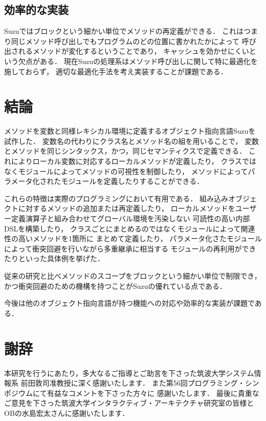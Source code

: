\documentclass[a4paper,11pt,dvipdfmx]{jreport}
\begin{document}
\section{効率的な実装}

Suzuではブロックという細かい単位でメソッドの再定義ができる．
これはつまり同じメソッド呼び出しでもプログラムのどの位置に書かれたかによって
呼び出されるメソッドが変化するということであり，
キャッシュを効かせにくいという欠点がある．
現在Suzuの処理系はメソッド呼び出しに関して特に最適化を施しておらず，
適切な最適化手法を考え実装することが課題である．


\chapter{結論}
\label{chapter:conclusion}

メソッドを変数と同様レキシカル環境に定義するオブジェクト指向言語Suzuを試作した．
変数名の代わりにクラス名とメソッド名の組を用いることで，
変数とメソッドを同じシンタックス，かつ，同じセマンティクスで定義できる．
これによりローカル変数に対応するローカルメソッドが定義したり，
クラスではなくモジュールによってメソッドの可視性を制御したり，
メソッドによってパラメータ化されたモジュールを定義したりすることができる．

これらの特徴は実際のプログラミングにおいて有用である．
組み込みオブジェクトに対するメソッドの追加または再定義したり，
ローカルメソッドをユーザー定義演算子と組み合わせてグローバル環境を汚染しない
可読性の高い内部DSLを構築したり，
クラスごとにまとめるのではなくモジュールによって関連性の高いメソッドを1箇所に
まとめて定義したり，
パラメータ化さたモジュールによって衝突回避を行いながら多重継承に相当する
モジュールの再利用ができたりといった具体例を挙げた．

従来の研究と比べメソッドのスコープをブロックという細かい単位で制限でき，
かつ衝突回避のための機構を持つことがSuzuの優れている点である．

今後は他のオブジェクト指向言語が持つ機能への対応や効率的な実装が課題である．


\chapter*{謝辞}

本研究を行うにあたり，多大なるご指導とご助言を下さった筑波大学システム情報系
前田敦司准教授に深く感謝いたします．
また第56回プログラミング・シンポジウムにて有益なコメントを下さった方々に
感謝いたします．
最後に貴重なご意見を下さった筑波大学インタラクティブ・アーキテクチャ研究室の皆様と
OBの水島宏太さんに感謝いたします．
\end{document}
